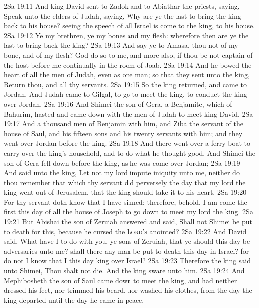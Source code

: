 \vs 2Sa 19:11 And king David sent to Zadok and to Abiathar the priests, saying, Speak unto the elders of Judah, saying, Why are ye the last to bring the king back to his house? seeing the speech of all Israel is come to the king,  to his house.
\vs 2Sa 19:12 Ye  my brethren, ye  my bones and my flesh: wherefore then are ye the last to bring back the king?
\vs 2Sa 19:13 And say ye to Amasa,  thou not of my bone, and of my flesh? God do so to me, and more also, if thou be not captain of the host before me continually in the room of Joab.
\vs 2Sa 19:14 And he bowed the heart of all the men of Judah, even as  one man; so that they sent  unto the king, Return thou, and all thy servants.
\vs 2Sa 19:15 So the king returned, and came to Jordan. And Judah came to Gilgal, to go to meet the king, to conduct the king over Jordan.
\vs 2Sa 19:16 And Shimei the son of Gera, a Benjamite, which  of Bahurim, hasted and came down with the men of Judah to meet king David.
\vs 2Sa 19:17 And  a thousand men of Benjamin with him, and Ziba the servant of the house of Saul, and his fifteen sons and his twenty servants with him; and they went over Jordan before the king.
\vs 2Sa 19:18 And there went over a ferry boat to carry over the king's household, and to do what he thought good. And Shimei the son of Gera fell down before the king, as he was come over Jordan;
\vs 2Sa 19:19 And said unto the king, Let not my lord impute iniquity unto me, neither do thou remember that which thy servant did perversely the day that my lord the king went out of Jerusalem, that the king should take it to his heart.
\vs 2Sa 19:20 For thy servant doth know that I have sinned: therefore, behold, I am come the first this day of all the house of Joseph to go down to meet my lord the king.
\vs 2Sa 19:21 But Abishai the son of Zeruiah answered and said, Shall not Shimei be put to death for this, because he cursed the \textsc{Lord's} anointed?
\vs 2Sa 19:22 And David said, What have I to do with you, ye sons of Zeruiah, that ye should this day be adversaries unto me? shall there any man be put to death this day in Israel? for do not I know that I  this day king over Israel?
\vs 2Sa 19:23 Therefore the king said unto Shimei, Thou shalt not die. And the king sware unto him.
\vs 2Sa 19:24 And Mephibosheth the son of Saul came down to meet the king, and had neither dressed his feet, nor trimmed his beard, nor washed his clothes, from the day the king departed until the day he came  in peace.
